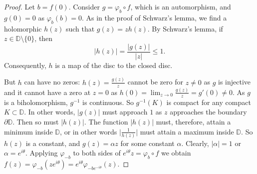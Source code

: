 \documentclass[12pt,openany]{book}
\newcommand{\sabs}[1]{\lvert {#1} \rvert}
\newcommand{\babs}[1]{\bigl\lvert {#1} \bigr\rvert}
\newcommand{\D}{{\mathbb{D}}}
\theoremstyle{plain}
\theoremstyle{remark}
\theoremstyle{definition}
\theoremstyle{exercise}
\theoremstyle{example}
\begin{document}
\begin{proof}
Let $b = f(0)$.
Consider $g = \varphi_b \circ f$, which is an automorphism,
and $g(0) = 0$ as
$\varphi_b(b) = 0$.
As in the proof of Schwarz's lemma, we find a holomorphic $h(z)$
such that $g(z) = z h(z)$.  By
Schwarz's lemma, if $z \in \D \setminus \{ 0 \}$, then
\begin{equation*}
\sabs{h(z)} = \frac{\sabs{g(z)}}{\sabs{z}} \leq 1 .
\end{equation*}
Consequently, $h$ is a map of the disc to the closed disc.

But $h$ can have no zeros:
$h(z) = \frac{g(z)}{z}$ cannot be zero for $z \not= 0$ as $g$ is injective
and it cannot have a zero at $z=0$
as $h(0) = \lim_{z\to 0} \frac{g(z)}{z} = g'(0) \not= 0$.  As $g$ is a biholomorphism, $g^{-1}$ is
continuous. So $g^{-1}(K)$ is compact for any compact $K \subset \D$.
In other words, $\sabs{g(z)}$ must approach $1$ as $z$
approaches the boundary $\partial \D$.
Then so must $\sabs{h(z)}$.
The function
$\sabs{h(z)}$ must, therefore, attain a minimum inside $\D$, or in other
words $\babs{\frac{1}{h(z)}}$ must attain a maximum inside $\D$.  So $h(z)$
is a constant, and $g(z) = \alpha z$ for some constant $\alpha$.
Clearly, 
$\sabs{\alpha} = 1$ or $\alpha = e^{i\theta}$.  Applying
$\varphi_{-b}$ to both sides of $e^{i\theta} z = \varphi_b \circ f$
we obtain
$f(z) = \varphi_{-b}(ze^{i\theta})
= e^{i \theta} \varphi_{-be^{-i\theta}}(z)$.
\end{proof}
\end{document}

